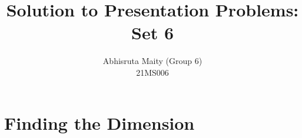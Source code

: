 \documentclass[11pt, a4paper, abstract=true]{scrartcl}
\begin{document}
    \subject{
    MA2102 (Linear Algebra I): Internal Assesment
}
\title{
    \huge Solution to Presentation Problems: Set 6
}
\author{
    Abhisruta Maity (Group 6)\\
    {\normalsize 21MS006}
}
\date{}
\publishers{
    \normalsize \emph{Indian Institute of Science Education and Research, Kolkata \\
    Mohanpur, West Bengal, 741246, India}
}
\maketitle
\tableofcontents

\newpage

\section{Finding the Dimension}
\end{document}
